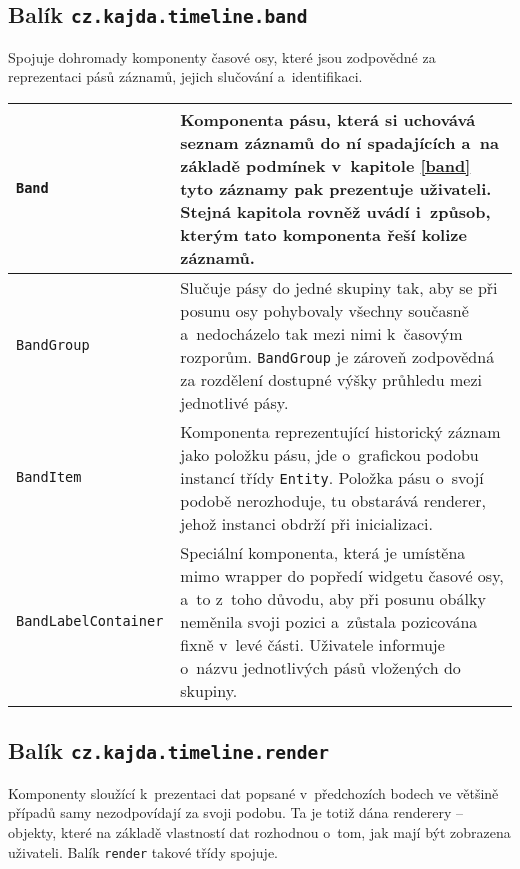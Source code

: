 			\subsection{Balík {\tt cz.kajda.timeline.band}}
				Spojuje dohromady komponenty časové osy, které jsou zodpovědné za reprezentaci pásů záznamů, jejich slučování a~identifikaci.
				\begin{longtable}{|p{}p{}|}
					\hline
					{\tt Band} & Komponenta pásu, která si uchovává seznam záznamů do ní spadajících a~na základě podmínek v~kapitole \ref{band} tyto záznamy pak prezentuje uživateli. Stejná kapitola rovněž uvádí i~způsob, kterým tato komponenta řeší kolize záznamů. \\
					\hline
					\tt BandGroup & Slučuje pásy do jedné skupiny tak, aby se při posunu osy pohybovaly všechny současně a~nedocházelo tak mezi nimi k~časovým rozporům. {\tt BandGroup} je zároveň zodpovědná za rozdělení dostupné výšky průhledu mezi jednotlivé pásy.\\
					\hline
					\tt BandItem & Komponenta reprezentující historický záznam jako položku pásu, jde o~grafickou podobu instancí třídy {\tt Entity}. Položka pásu o~svojí podobě nerozhoduje, tu obstarává renderer, jehož instanci obdrží při inicializaci.\\
					\hline
					\tt BandLabelContainer & Speciální komponenta, která je umístěna mimo wrapper do popředí widgetu časové osy, a~to z~toho důvodu, aby při posunu obálky neměnila svoji pozici a~zůstala pozicována fixně v~levé části. Uživatele informuje o~názvu jednotlivých pásů vložených do skupiny.\\
					\hline
				\end{longtable}
				
			\subsection{Balík {\tt cz.kajda.timeline.render}}
				Komponenty sloužící k~prezentaci dat popsané v~předchozích bodech ve většině případů samy nezodpovídají za svoji podobu. Ta je totiž dána renderery -- \mbox{objekty}, které na základě vlastností dat rozhodnou o~tom, jak mají být zobrazena uživa\-teli. Balík {\tt render} takové třídy spojuje.
				
